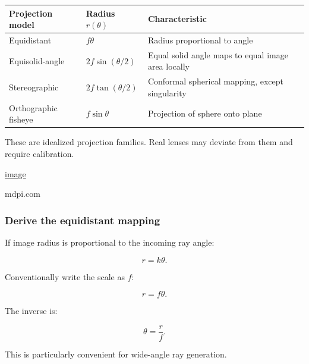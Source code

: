 {\def\LTcaptype{none} %
\begin{longtable}[]{@{}
  >{\raggedright\arraybackslash}p{}
  >{\raggedright\arraybackslash}p{}
  >{\raggedright\arraybackslash}p{}@{}}
\toprule\noalign{}
\begin{minipage}[b]{\linewidth}\raggedright
Projection model
\end{minipage} & \begin{minipage}[b]{\linewidth}\raggedright
Radius \(r(\theta)\)
\end{minipage} & \begin{minipage}[b]{\linewidth}\raggedright
Characteristic
\end{minipage} \\
\midrule\noalign{}
\endhead
\bottomrule\noalign{}
\endlastfoot
Equidistant & \(f\theta\) & Radius proportional to angle \\
Equisolid-angle & \(2f\sin(\theta/2)\) & Equal solid angle maps to equal image area locally \\
Stereographic & \(2f\tan(\theta/2)\) & Conformal spherical mapping, except singularity \\
Orthographic fisheye & \(f\sin\theta\) & Projection of sphere onto plane \\
\end{longtable}
}

These are idealized projection families. Real lenses may deviate from them and require calibration. 

\href{https://www.google.com/s2/favicons?domain=https://www.mdpi.com&sz=32}{image}

mdpi.com

\subsubsection{Derive the equidistant mapping}\label{derive-the-equidistant-mapping}

If image radius is proportional to the incoming ray angle:

\[ r=k\theta. \]

Conventionally write the scale as \(f\):

\[ \boxed{r=f\theta}. \]

The inverse is:

\[ \boxed{\theta=\frac rf}. \]

This is particularly convenient for wide-angle ray generation.

